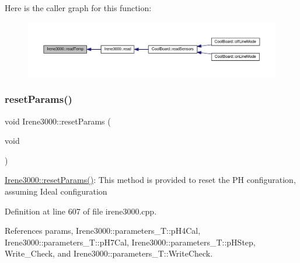 Here is the caller graph for this function\+:\nopagebreak
\begin{figure}[H]
\begin{center}
\leavevmode
\includegraphics[width=350pt]{classIrene3000_a94ad40f281d83ad1be20bf1edd6fe802_icgraph}
\end{center}
\end{figure}
\mbox{\label{classIrene3000_a0fba280e8b7c881307efa31281aa691d}} 
\subsubsection{\texorpdfstring{reset\+Params()}{resetParams()}}
{\footnotesize\ttfamily void Irene3000\+::reset\+Params (\begin{DoxyParamCaption}\item[{void}]{ }\end{DoxyParamCaption})}

\hyperlink{classIrene3000_a0fba280e8b7c881307efa31281aa691d}{Irene3000\+::reset\+Params()}\+: This method is provided to reset the PH configuration, assuming Ideal configuration 

Definition at line 607 of file irene3000.\+cpp.



References params, Irene3000\+::parameters\+\_\+\+T\+::p\+H4\+Cal, Irene3000\+::parameters\+\_\+\+T\+::p\+H7\+Cal, Irene3000\+::parameters\+\_\+\+T\+::p\+H\+Step, Write\+\_\+\+Check, and Irene3000\+::parameters\+\_\+\+T\+::\+Write\+Check.


